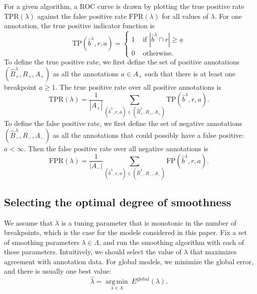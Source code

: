 \documentclass[10pt]{bmc_article}
\newcommand{\sectionpick}{Selecting the optimal degree of smoothness}
\newcommand{\argmin}{\operatorname*{arg\, min}}
\newenvironment{bmcformat}{\begin{raggedright}\baselineskip20pt\sloppy\setboolean{publ}{false}}{\end{raggedright}\baselineskip20pt\sloppy}
\begin{document}
\begin{bmcformat}
For a given algorithm, a ROC curve is drawn by plotting the true
positive rate $\text{TPR}(\lambda)$ against the false positive rate
$\text{FPR}(\lambda)$ for all values of $\lambda$. For one
annotation, the true positive indicator function is
\begin{equation}
  \label{eq:tp}
  \text{TP}(\hat b^\lambda, r, a) =
  \begin{cases}
   1 & \text{ if }|\hat b^\lambda\cap r|\geq \underline a\\
   0 & \text{ otherwise.}
  \end{cases}
\end{equation}
To define the true positive rate, we first define the set of positive
annotations $(\hat B^\lambda_+,R_+,A_+)$ as all the annotations $a\in
A_+$ such that there is at least one breakpoint $\underline a\geq
1$. The true positive rate over all positive annotations is
\begin{equation}
  \label{eq:tpr}
  \text{TPR}(\lambda) = 
\frac{1}{|A_+|}
\sum_{(\hat b^\lambda, r, a)\in (\hat B^\lambda_+,R_+,A_+)}
\text{TP}(\hat b^\lambda, r, a).
\end{equation}
To define the false positive rate, we first define the set of negative
annotations $(\hat B^\lambda_-, R_-, A_-)$ as all the annotations that
could possibly have a false positive: $\overline a<\infty$. Then the
false positive rate over all negative annotations is
\begin{equation}
  \label{eq:tpr}
  \text{FPR}(\lambda) = 
\frac{1}{|A_-|}
\sum_{(\hat b^\lambda, r, a)\in (\hat B^\lambda_-,R_-,A_-)}
\text{FP}(\hat b^\lambda, r, a).
\end{equation}

\label{quantify}

\subsection*{\sectionpick}

We assume that $\lambda$ is a tuning parameter that is monotonic in
the number of breakpoints, which is the case for the models considered
in this paper. Fix a set of smoothing parameters $\lambda\in\Lambda$,
and run the smoothing algorithm with each of these
parameters. Intuitively, we should select the value of $\lambda$ that
maximizes agreement with annotation data. For global models, we
minimize the global error, and there is usually one best value:
\begin{equation}
  \label{eq:hat_lambda_i}
  \hat \lambda=\argmin_{\lambda\in\Lambda}\  E^\text{global}(\lambda).
\end{equation}


\end{bmcformat}
\end{document}
